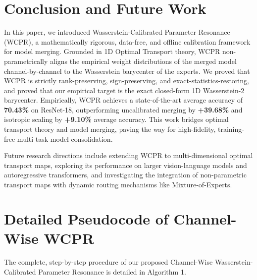\documentclass{article}
\theoremstyle{plain}
\theoremstyle{definition}
\theoremstyle{remark}
\begin{document}
\section{Conclusion and Future Work}
\label{sec:conclusion}

In this paper, we introduced Wasserstein-Calibrated Parameter Resonance (WCPR), a mathematically rigorous, data-free, and offline calibration framework for model merging. Grounded in 1D Optimal Transport theory, WCPR non-parametrically aligns the empirical weight distributions of the merged model channel-by-channel to the Wasserstein barycenter of the experts. We proved that WCPR is strictly rank-preserving, sign-preserving, and exact-statistics-restoring, and proved that our empirical target is the exact closed-form 1D Wasserstein-2 barycenter. Empirically, WCPR achieves a state-of-the-art average accuracy of \textbf{70.43\%} on ResNet-18, outperforming uncalibrated merging by \textbf{+39.68\%} and isotropic scaling by \textbf{+9.10\%} average accuracy. This work bridges optimal transport theory and model merging, paving the way for high-fidelity, training-free multi-task model consolidation.

Future research directions include extending WCPR to multi-dimensional optimal transport maps, exploring its performance on larger vision-language models and autoregressive transformers, and investigating the integration of non-parametric transport maps with dynamic routing mechanisms like Mixture-of-Experts.




\newpage
\appendix
\onecolumn

\section{Detailed Pseudocode of Channel-Wise WCPR}
\label{app:pseudocode}
The complete, step-by-step procedure of our proposed Channel-Wise Wasserstein-Calibrated Parameter Resonance is detailed in Algorithm 1.
\end{document}
